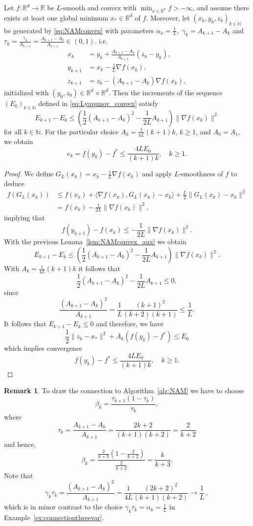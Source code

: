 \documentclass[12pt,openany]{book}
\theoremstyle{definition}
\newtheorem{remark}[thm]{Remark}
\theoremstyle{definition}
\newcommand{\N}{\mathbb{N}}
\newcommand{\R}{\mathbb{R}}
\begin{document}
\begin{thm}
Let $f:\R^d\to\R$ be $L$-smooth and convex with $\min_{x\in\R^d} f>-\infty$, and assume there exists at least one global minimum $x_\ast\in\R^d$ of $f$.  Moreover, let $(x_k,y_k,z_k)_{k\in\N}$ be generated by \eqref{eq:NAMconvex} with parameters $\alpha_k = \frac1L,$ $\gamma_k = A_{k+1}-A_k$ and $\tau_k = \frac{\gamma_k}{A_{k+1}}=\frac{A_{k+1}-A_k}{A_{k+1}} \in(0,1)$. i.e. 
\begin{equation*}
\begin{split}
x_k &= y_k + \frac{A_{k+1}-A_k}{A_{k+1}}(z_k-y_k),\\
y_{k+1} &= x_k - \frac{1}{L} \nabla f(x_k),\\
z_{k+1} &=z_k -(A_{k+1}-A_k)\nabla f(x_k),
\end{split}
\end{equation*}
initialized with $(y_0,z_0)\in\R^{d}\times\R^d$. Then the increments of the sequence $(E_k)_{k\in\N}$ defined in \eqref{eq:Lyapunov_convex} satisfy
\[E_{k+1} - E_k \le \left(\frac12 (A_{k+1}-A_k)^2 -\frac{1}{2L}A_{k+1}\right)\|\nabla f(x_k)\|^2\]
for all $k\in\N$. For the particular choice $A_k = \frac{1}{4L}(k+1)k$, $k\ge1$, and $A_0 = A_1$, we obtain
\[e_k = f(y_k) -f^\ast\le \frac{4LE_0}{(k+1)k},\quad k\ge1. \]
\end{thm}
\begin{proof}
We define $G_L(x_k) = x_k - \frac1L \nabla f(x_k)$ and apply $L$-smoothness of $f$ to deduce
\begin{align*}
f(G_L(x_k)) &\le f(x_k) + \langle \nabla f(x_k), G_L(x_k) - x_k\rangle + \frac{L}2 \|G_L(x_k)-x_k\|^2 \\
&=f(x_k) - \frac1{2L} \|\nabla f(x_k)\|^2,
\end{align*} 
implying that
\[f(y_{k+1})-f(x_k) \le -\frac{1}{2L}\|\nabla f(x_k)\|^2. \]
With the previous Lemma~\ref{lem:NAMconvex_aux} we obtain
\[E_{k+1} - E_k \le \left(\frac12 (A_{k+1}-A_k)^2 -\frac{1}{2L}A_{k+1}\right)\|\nabla f(x_k)\|^2.\]
With $A_k = \frac1{4L}(k+1)k$ it follows that
\[\frac{1}{2}(A_{k+1}-A_k)^2 - \frac{1}{2L}A_{k+1}\le 0, \]
since \[\frac{(A_{k+1}-A_k)^2}{A_{k+1}}=\frac{1}{L} \frac{(k+1)^2}{(k+2)(k+1)}\le \frac1L.\]
It follows that $E_{k+1}-E_k \le 0$ and therefore, we have
\[\frac12 \|z_k-x_\ast\|^2 + A_k (f(y_k)-f^\ast)\le E_0 \]
which implies convergence
\[f(y_k)-f^\ast \le \frac{4LE_0}{(k+1)k},\quad k\ge1.\]
\end{proof}
\begin{remark}
To draw the connection to Algorithm~\ref{alg:NAM} we have to choose
\[ \beta_k = \frac{\tau_{k+1}(1-\tau_k)}{\tau_k}, \]
where \[\tau_k = \frac{A_{k+1}-A_k}{A_{k+1}} = \frac{2k+2}{(k+1)(k+2)} = \frac{2}{k+2}\]
and hence,
\[\beta_k = \frac{\frac{2}{k+3} (1-\frac{2}{k+2})}{\frac2{k+2}} = \frac{k}{k+3}.\]
Note that 
\[\gamma_k\tau_k = \frac{(A_{k+1}-A_k)^2}{A_{k+1}} = \frac{1}{4L}\frac{(2k+2)^2}{(k+1)(k+2)} \to \frac1L\,,\]
which is in minor contrast to the choice $\gamma_k\tau_k = \alpha_k = \frac1L$ in Example~\ref{ex:connectionthreevar}.
\end{remark}
\end{document}
